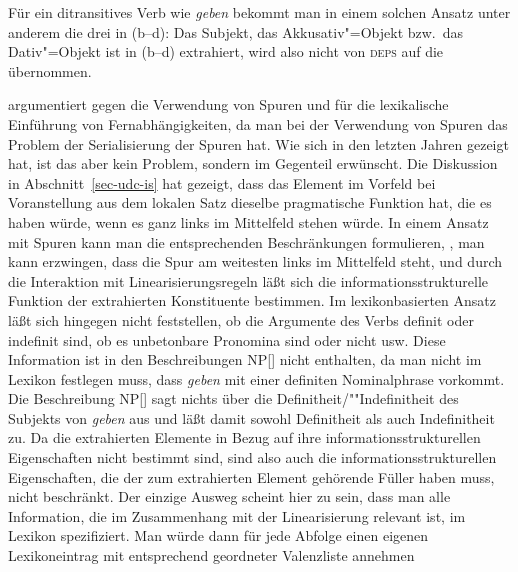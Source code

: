 \noindent
Für ein ditransitives Verb wie \emph{geben} bekommt man in einem solchen Ansatz
unter anderem die drei \compslen in (b--d):
\eal
\ex {}
\ex {}
\ex {}
\ex {}
\zl
Das Subjekt, das Akkusativ"=Objekt bzw.\ das Dativ"=Objekt ist in (b--d) extrahiert, wird
also nicht von \textsc{deps} auf die \compsl übernommen.

\citet[--148]{Nerbonne94a} argumentiert gegen die Verwendung von Spuren und für
die lexikalische Einführung von Fernabhängigkeiten, da man bei der Verwendung von Spuren
das Problem der Serialisierung der Spuren hat. Wie sich in den letzten Jahren gezeigt hat,
ist das aber kein Problem, sondern im Gegenteil erwünscht.
Die Diskussion in Abschnitt~\ref{sec-udc-is} hat gezeigt, dass das Element im Vorfeld
bei Voranstellung aus dem lokalen Satz dieselbe pragmatische Funktion hat, die es
haben würde, wenn es ganz links im Mittelfeld stehen würde. In einem Ansatz mit Spuren kann
man die entsprechenden Beschränkungen formulieren, \dash, man kann erzwingen, dass die
Spur am weitesten links im Mittelfeld steht, und durch die Interaktion mit Linearisierungsregeln
läßt sich die informationsstrukturelle Funktion der extrahierten Konstituente bestimmen.
Im lexikonbasierten Ansatz läßt sich hingegen nicht feststellen, ob die Argumente
des Verbs definit oder indefinit sind, ob es unbetonbare Pronomina sind oder nicht usw.
Diese Information ist in den Beschreibungen NP[] nicht enthalten, da man nicht im
Lexikon festlegen muss, dass \emph{geben} mit einer definiten Nominalphrase vorkommt. Die Beschreibung
NP[] sagt nichts über die Definitheit/""Indefinitheit des Subjekts von \emph{geben} aus
und läßt damit sowohl Definitheit als auch Indefinitheit zu.
Da die extrahierten Elemente in Bezug auf ihre informationsstrukturellen Eigenschaften nicht
bestimmt sind, sind also auch die informationsstrukturellen Eigenschaften, die der zum extrahierten
Element gehörende Füller haben muss, nicht beschränkt.
Der einzige Ausweg scheint hier zu sein, dass man alle Information, die im Zusammenhang
mit der Linearisierung relevant ist, im Lexikon spezifiziert. Man würde dann für jede
Abfolge einen eigenen Lexikoneintrag mit entsprechend geordneter Valenzliste annehmen
